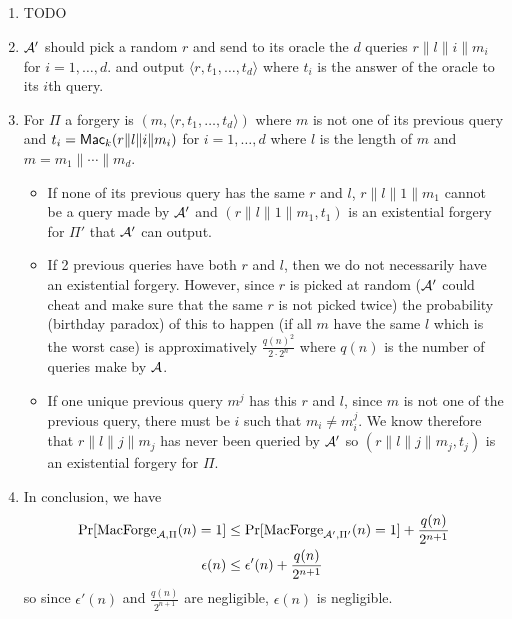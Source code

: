 \subsection{}
\begin{solution}
  \begin{enumerate}
    \item TODO
    \item $\mathcal{A}'$ should pick a random $r$ and send to its oracle the $d$ queries $r\|l\|i\|m_i$ for $i = 1, \ldots, d$.
      and output $\langle r, t_1, \ldots, t_d \rangle$ where $t_i$ is the answer of the oracle to its $i$th query.
    \item For $\Pi$ a forgery is $(m, \langle r, t_1, \ldots, t_d \rangle)$ where $m$ is not one of its previous query
      and $t_i = \operatorname{\mathsf{Mac}}_k(r\|l\|i\|m_i)$ for $i = 1, \ldots, d$ where $l$ is the length of $m$ and $m = m_1\| \cdots \|m_d$.
      \begin{itemize}
        \item
          If none of its previous query has the same $r$ and $l$, $r\|l\|1\|m_1$ cannot be a query made by $\mathcal{A}'$ and
          $(r\|l\|1\|m_1, t_1)$ is an existential forgery for $\Pi'$ that $\mathcal{A}'$ can output.
        \item
          If 2 previous queries have both $r$ and $l$, then we do not necessarily have an existential forgery.
          However, since $r$ is picked at random ($\mathcal{A}'$ could cheat and make sure that the same $r$ is not picked twice)
          the probability (birthday paradox) of this to happen (if all $m$ have the same $l$ which is the worst case) is approximatively
          $\frac{q(n)^2}{2 \cdot 2^n}$ where $q(n)$ is the number of queries make by $\mathcal{A}$.
        \item
          If one unique previous query $m^j$ has this $r$ and $l$, since $m$ is not one of the previous query, there must be $i$
          such that $m_i \neq m_i^j$.
          We know therefore that $r\|l\|j\|m_j$ has never been queried by $\mathcal{A}'$ so $(r\|l\|j\|m_j, t_j)$ is an existential forgery for $\Pi$.
      \end{itemize}
    \item In conclusion, we have
      \begin{align*}
        \Pr[\operatorname{MacForge}_{\mathcal{A},\Pi}(n) = 1]
        & \leq \Pr[\operatorname{MacForge}_{\mathcal{A}',\Pi'}(n) = 1] + \frac{q(n)}{2^{n+1}}\\
        \epsilon(n)
        & \leq \epsilon'(n) + \frac{q(n)}{2^{n+1}}
      \end{align*}
      so since $\epsilon'(n)$ and $\frac{q(n)}{2^{n+1}}$ are negligible,
      $\epsilon(n)$ is negligible.
  \end{enumerate}
\end{solution}

